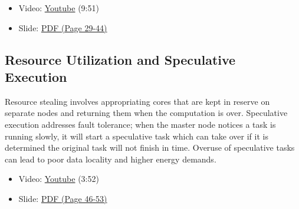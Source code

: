 \begin{itemize}

\item
  Video: \href{https://www.youtube.com/watch?v=u9UpgTnOZz4}{Youtube}
  (9:51)
\item
  Slide:
  \href{https://drive.google.com/open?id=0B88HKpainTSfT28zLTdKYWhGdGM}{PDF
  (Page 29-44)}
\end{itemize}

\subsection{Resource Utilization and Speculative
Execution}\label{resource-utilization-and-speculative-execution}

Resource stealing involves appropriating cores that are kept in reserve
on separate nodes and returning them when the computation is over.
Speculative execution addresses fault tolerance; when the master node
notices a task is running slowly, it will start a speculative task which
can take over if it is determined the original task will not finish in
time. Overuse of speculative tasks can lead to poor data locality and
higher energy demands.

\begin{itemize}

\item
  Video: \href{https://www.youtube.com/watch?v=wWyFiqDIYus}{Youtube}
  (3:52)
\end{itemize}

\begin{itemize}

\item
  Slide:
  \href{https://drive.google.com/open?id=0B88HKpainTSfT28zLTdKYWhGdGM}{PDF
  (Page 46-53)}
\end{itemize}
